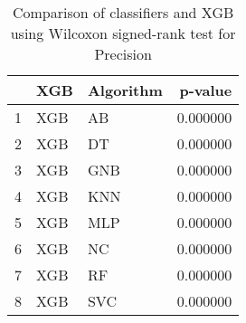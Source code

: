 \begin{table}
\footnotesize
\caption{Comparison of classifiers and XGB using Wilcoxon signed-rank test for Precision}
\label{tab:XGB wilcoxon Precision comparison}
\begin{tabular}{lllr}
\hline
 & XGB & Algorithm & p-value \\
\hline
1 & XGB & AB & 0.000000 \\
2 & XGB & DT & 0.000000 \\
3 & XGB & GNB & 0.000000 \\
4 & XGB & KNN & 0.000000 \\
5 & XGB & MLP & 0.000000 \\
6 & XGB & NC & 0.000000 \\
7 & XGB & RF & 0.000000 \\
8 & XGB & SVC & 0.000000 \\
\hline
\end{tabular}
\end{table}
